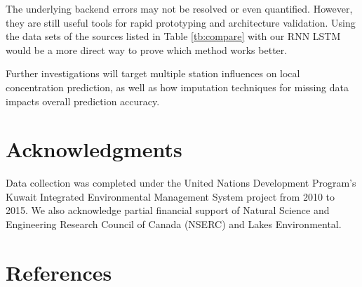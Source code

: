 \documentclass[preprint,12pt,authoryear]{elsarticle}
\begin{document}
\begin{linenumbers}
The underlying backend errors may not be resolved or even quantified. However, they are still useful tools for rapid prototyping and architecture validation. Using the data sets of the sources listed in Table \ref{tb:compare} with our RNN LSTM would be a more direct way to prove which method works better.

Further investigations will target multiple station influences on local concentration prediction, as well as how imputation techniques for missing data impacts overall prediction accuracy. 

\section{Acknowledgments}
Data collection was completed under the United Nations Development Program's Kuwait Integrated Environmental Management System project from 2010 to 2015.  We also acknowledge partial financial support of Natural Science and Engineering Research Council of Canada (NSERC) and Lakes Environmental.
 
\section{References}

\end{linenumbers}
{}

\end{document}
